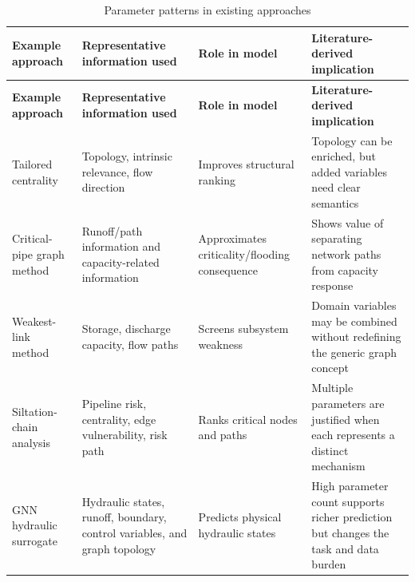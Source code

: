 {\small
\renewcommand{\arraystretch}{1.15}
\begin{longtable}{@{}>{\raggedright\arraybackslash}p{0.22\dimexpr\linewidth-6\tabcolsep\relax}
                     >{\raggedright\arraybackslash}p{0.26\dimexpr\linewidth-6\tabcolsep\relax}
                     >{\raggedright\arraybackslash}p{0.22\dimexpr\linewidth-6\tabcolsep\relax}
                     >{\raggedright\arraybackslash}p{0.30\dimexpr\linewidth-6\tabcolsep\relax}@{}}
\caption{Parameter patterns in existing approaches}\label{tab:parameter-patterns}\\
\toprule
\textbf{Example approach} & \textbf{Representative information used} & \textbf{Role in model} & \textbf{Literature-derived implication} \\
\midrule
\endfirsthead
\toprule
\textbf{Example approach} & \textbf{Representative information used} & \textbf{Role in model} & \textbf{Literature-derived implication} \\
\midrule
\endhead
\bottomrule
\endlastfoot

Tailored centrality~\citep{simone2022,simone2023} &
Topology, intrinsic relevance, flow direction &
Improves structural ranking &
Topology can be enriched, but added variables need clear semantics \\
\addlinespace

Critical-pipe graph method~\citep{dastgir2023} &
Runoff/path information and capacity-related information &
Approximates criticality/flooding consequence &
Shows value of separating network paths from capacity response \\
\addlinespace

Weakest-link method~\citep{meijer2023} &
Storage, discharge capacity, flow paths &
Screens subsystem weakness &
Domain variables may be combined without redefining the generic graph concept \\
\addlinespace

Siltation-chain analysis~\citep{zhang2025} &
Pipeline risk, centrality, edge vulnerability, risk path &
Ranks critical nodes and paths &
Multiple parameters are justified when each represents a distinct mechanism \\
\addlinespace

GNN hydraulic surrogate~\citep{zhang2024} &
Hydraulic states, runoff, boundary, control variables, and graph topology &
Predicts physical hydraulic states &
High parameter count supports richer prediction but changes the task and data burden \\

\end{longtable}
}
